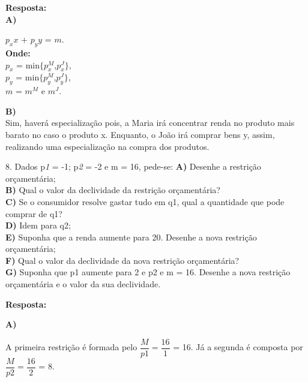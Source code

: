 \begin{flushleft}
\textbf{Resposta:} 
\\
\textbf{A)} 
\\
\begin{center}

{$p_{x}x$} + {$p_{y}y$} = $m$.
\\

\textbf{Onde:}
\\
$p_{x}$ = min{$\lbrace$}{$p^M_x$},{$p^J_x$}{$\rbrace$},\\
$p_{y}$ = min{$\lbrace$}{$p^M_y$},{$p^J_y$}{$\rbrace$},\\
{$m$} = {$m^M$} e {$m^J$}.\\
\end{center}

\textbf{B)}
\\
Sim, haverá especialização pois, a Maria irá concentrar renda no produto mais barato no caso o produto x. Enquanto, o João irá comprar bens y, assim, realizando uma especialização na compra dos produtos. \singlespacing

8. Dados p\textit{1} = -1; p\textit{2} = -2 e m = 16, pede-se:
\singlespacing
\textbf{A)} Desenhe a restrição orçamentária;
\\
\textbf{B)} Qual o valor da declividade da restrição orçamentária?
\\
\textbf{C)} Se o consumidor resolve gastar tudo em q1, qual a quantidade que pode comprar de q1?
\\
\textbf{D)} Idem para q2;
\\
\textbf{E)} Suponha que a renda aumente para 20. Desenhe a nova restrição orçamentária;
\\
\textbf{F)} Qual o valor da declividade da nova restrição orçamentária?
\\
\textbf{G)} Suponha que p1 aumente para 2 e p2 e m = 16. Desenhe a nova restrição orçamentária e o valor da sua declividade.

\singlespacing

\textbf{Resposta:} \singlespacing

\textbf{A)}
\\
\begin{center}

A primeira restrição é formada pelo $\dfrac{M}{p\textit{1}} = \dfrac{16}{1}$ = 16. 
\singlespacing
Já a segunda é composta por $\dfrac{M}{p\textit{2}} = \dfrac{16}{2}$ = 8.

\begin{tikzpicture}[scale=0.5, axis/.style={very thick, ->, >=stealth'}, important line/.style={thick}, dashed line/.style={dashed, thin}, pile/.style={thick, ->, >=stealth', shorten <=2pt, shorten >=2pt}, every node/.style={color=black}]


\end{tikzpicture}
\end{center}
\end{flushleft}
